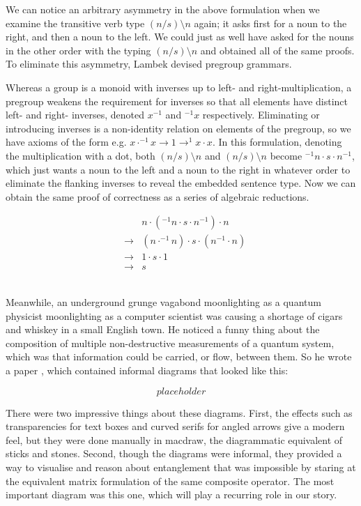 We can notice an arbitrary asymmetry in the above formulation when we examine the transitive verb type $(n/s)\setminus n$ again; it asks first for a noun to the right, and then a noun to the left. We could just as well have asked for the nouns in the other order with the typing $(n/s)\setminus n$ and obtained all of the same proofs. To eliminate this asymmetry, Lambek devised pregroup grammars.

Whereas a group is a monoid with inverses up to left- and right-multiplication, a pregroup weakens the requirement for inverses so that all elements have distinct left- and right- inverses, denoted $x^{-1}$ and $^{-1}x$ respectively. Eliminating or introducing inverses is a non-identity relation on elements of the pregroup, so we have axioms of the form e.g. $x \cdot ^{-1}x \rightarrow 1 \rightarrow ^{1}x \cdot x$. In this formulation, denoting the multiplication with a dot, both $(n/s)\setminus n$ and $(n/s)\setminus n$ become $^{-1}n \cdot s \cdot n^{-1}$, which just wants a noun to the left and a noun to the right in whatever order to eliminate the flanking inverses to reveal the embedded sentence type. Now we can obtain the same proof of correctness as a series of algebraic reductions.

\begin{align}
& &n \cdot (^{-1}n \cdot s \cdot n^{-1}) \cdot n\\
&\rightarrow &(n \cdot ^{-1}n) \cdot s \cdot (n^{-1} \cdot n)\\
&\rightarrow & 1 \cdot s \cdot 1\\
&\rightarrow & s
\end{align}

\\

Meanwhile, an underground grunge vagabond moonlighting as a quantum physicist moonlighting as a computer scientist was causing a shortage of cigars and whiskey in a small English town. He noticed a funny thing about the composition of multiple non-destructive measurements of a quantum system, which was that information could be carried, or flow, between them. So he wrote a paper \citep{}, which contained informal diagrams that looked like this:

\[placeholder\]

There were two impressive things about these diagrams. First, the effects such as transparencies for text boxes and curved serifs for angled arrows give a modern feel, but they were done manually in macdraw, the diagrammatic equivalent of sticks and stones. Second, though the diagrams were informal, they provided a way to visualise and reason about entanglement that was impossible by staring at the equivalent matrix formulation of the same composite operator. The most important diagram was this one, which will play a recurring role in our story.

